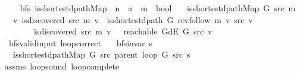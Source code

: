 \begin{isabellebody}
\ \ \isamarkupfalse%
\isanewline
{}\isamarkupfalse%
%
\endisatagproof
{\isafoldproof}%
%
\isadelimproof
\isanewline
%
\endisadelimproof
\isanewline
{}\isamarkupfalse%
\ {\isacharparenleft}{\kern0pt}\ bfs{\isacharparenright}{\kern0pt}\ is{\isacharunderscore}{\kern0pt}shortest{\isacharunderscore}{\kern0pt}dpath{\isacharunderscore}{\kern0pt}Map\ {\isacharcolon}{\kern0pt}{\isacharcolon}{\kern0pt}\ {\isachardoublequoteopen}{\isacharprime}{\kern0pt}n\ {\isasymRightarrow}\ {\isacharprime}{\kern0pt}a\ {\isasymRightarrow}\ {\isacharprime}{\kern0pt}m\ {\isasymRightarrow}\ bool{\isachardoublequoteclose}\ \isanewline
\ \ {\isachardoublequoteopen}is{\isacharunderscore}{\kern0pt}shortest{\isacharunderscore}{\kern0pt}dpath{\isacharunderscore}{\kern0pt}Map\ G\ src\ m\ {\isasymequiv}\isanewline
\ \ \ {\isasymforall}v{\isachardot}{\kern0pt}\ {\isacharparenleft}{\kern0pt}is{\isacharunderscore}{\kern0pt}discovered\ src\ m\ v\ {\isasymlongrightarrow}\ is{\isacharunderscore}{\kern0pt}shortest{\isacharunderscore}{\kern0pt}dpath\ G\ {\isacharparenleft}{\kern0pt}rev{\isacharunderscore}{\kern0pt}follow\ m\ v{\isacharparenright}{\kern0pt}\ src\ v{\isacharparenright}{\kern0pt}\ {\isasymand}\isanewline
\ \ \ \ \ \ \ {\isacharparenleft}{\kern0pt}{\isasymnot}\ is{\isacharunderscore}{\kern0pt}discovered\ src\ m\ v\ {\isasymlongrightarrow}\ {\isasymnot}\ reachable\ {\isacharparenleft}{\kern0pt}G{\isachardot}{\kern0pt}dE\ G{\isacharparenright}{\kern0pt}\ src\ v{\isacharparenright}{\kern0pt}{\isachardoublequoteclose}\isanewline
\isanewline
{}\isamarkupfalse%
\ {\isacharparenleft}{\kern0pt}\ bfs{\isacharunderscore}{\kern0pt}valid{\isacharunderscore}{\kern0pt}input{\isacharparenright}{\kern0pt}\ loop{\isacharunderscore}{\kern0pt}correct{\isacharcolon}{\kern0pt}\isanewline
\ \ \ {\isachardoublequoteopen}bfs{\isacharunderscore}{\kern0pt}invar{\isacharprime}{\kern0pt}{\isacharprime}{\kern0pt}\ s{\isachardoublequoteclose}\isanewline
\ \ \ {\isachardoublequoteopen}is{\isacharunderscore}{\kern0pt}shortest{\isacharunderscore}{\kern0pt}dpath{\isacharunderscore}{\kern0pt}Map\ G\ src\ {\isacharparenleft}{\kern0pt}parent\ {\isacharparenleft}{\kern0pt}loop\ G\ src\ s{\isacharparenright}{\kern0pt}{\isacharparenright}{\kern0pt}{\isachardoublequoteclose}\isanewline
%
\isadelimproof
\ \ %
\endisadelimproof
%
\isatagproof
{}\isamarkupfalse%
\ assms\ loop{\isacharunderscore}{\kern0pt}sound\ loop{\isacharunderscore}{\kern0pt}complete\isanewline

\end{isabellebody}
